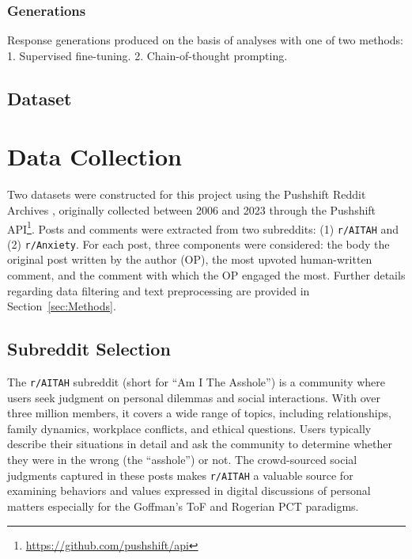 \subsubsection{Generations}

\textcolor{black!60}{Response generations produced on the basis of analyses with one of two methods: 1. Supervised fine-tuning.
2. Chain-of-thought prompting.}
\textcolor{black!30}{\lipsum[9-10]}

\subsection{Dataset}
\section{Data Collection}

Two datasets were constructed for this project using the Pushshift Reddit Archives \cite{pushshift}, originally collected between 2006 and 2023 through the Pushshift API\footnote{\url{https://github.com/pushshift/api}}. Posts and comments were extracted from two subreddits: (1) \texttt{r/AITAH} and (2) \texttt{r/Anxiety}. For each post, three components were considered: the body the original post written by the author (OP), the most upvoted human-written comment, and the comment with which the OP engaged the most. Further details regarding data filtering and text preprocessing are provided in Section~\ref{sec:Methods}.  

\subsection{Subreddit Selection}

The \texttt{r/AITAH} subreddit (short for ``Am I The Asshole'') is a community where users seek judgment on personal dilemmas and social interactions. With over three million members, it covers a wide range of topics, including relationships, family dynamics, workplace conflicts, and ethical questions. Users typically describe their situations in detail and ask the community to determine whether they were in the wrong (the ``asshole'') or not. The crowd-sourced social judgments captured in these posts makes \texttt{r/AITAH} a valuable source for examining behaviors and values expressed in digital discussions of personal matters especially for the Goffman's ToF and Rogerian PCT paradigms.  

